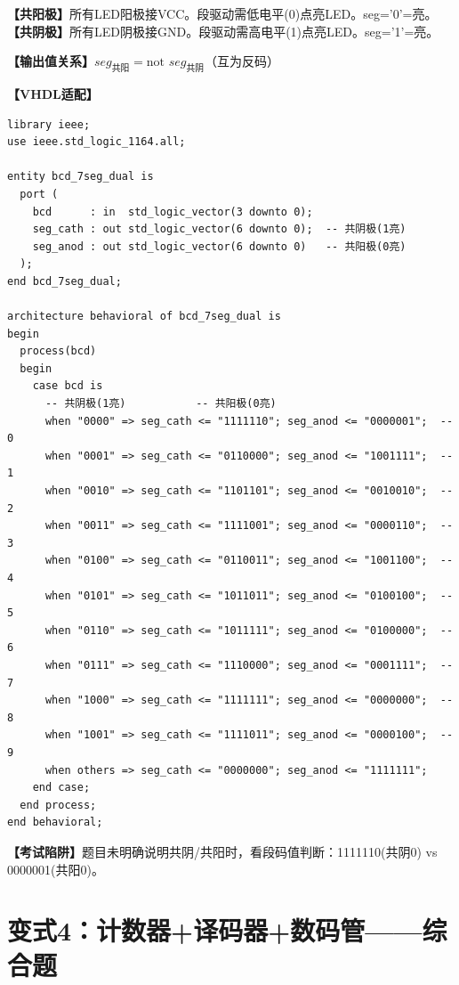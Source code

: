 \begin{detailbox}[完整教学]
\textbf{【共阳极】}所有LED阳极接VCC。段驱动需低电平(0)点亮LED。seg='0'=亮。
\textbf{【共阴极】}所有LED阴极接GND。段驱动需高电平(1)点亮LED。seg='1'=亮。

\textbf{【输出值关系】}$seg_{\text{共阳}} = \text{not } seg_{\text{共阴}}$（互为反码）

\textbf{【VHDL适配】}
\begin{lstlisting}
library ieee;
use ieee.std_logic_1164.all;

entity bcd_7seg_dual is
  port (
    bcd      : in  std_logic_vector(3 downto 0);
    seg_cath : out std_logic_vector(6 downto 0);  -- 共阴极(1亮)
    seg_anod : out std_logic_vector(6 downto 0)   -- 共阳极(0亮)
  );
end bcd_7seg_dual;

architecture behavioral of bcd_7seg_dual is
begin
  process(bcd)
  begin
    case bcd is
      -- 共阴极(1亮)           -- 共阳极(0亮)
      when "0000" => seg_cath <= "1111110"; seg_anod <= "0000001";  -- 0
      when "0001" => seg_cath <= "0110000"; seg_anod <= "1001111";  -- 1
      when "0010" => seg_cath <= "1101101"; seg_anod <= "0010010";  -- 2
      when "0011" => seg_cath <= "1111001"; seg_anod <= "0000110";  -- 3
      when "0100" => seg_cath <= "0110011"; seg_anod <= "1001100";  -- 4
      when "0101" => seg_cath <= "1011011"; seg_anod <= "0100100";  -- 5
      when "0110" => seg_cath <= "1011111"; seg_anod <= "0100000";  -- 6
      when "0111" => seg_cath <= "1110000"; seg_anod <= "0001111";  -- 7
      when "1000" => seg_cath <= "1111111"; seg_anod <= "0000000";  -- 8
      when "1001" => seg_cath <= "1111011"; seg_anod <= "0000100";  -- 9
      when others => seg_cath <= "0000000"; seg_anod <= "1111111";
    end case;
  end process;
end behavioral;
\end{lstlisting}

\textbf{【考试陷阱】}题目未明确说明共阴/共阳时，看段码值判断：1111110(共阴0) vs 0000001(共阳0)。
\end{detailbox}


\section{变式4：计数器+译码器+数码管——综合题}

